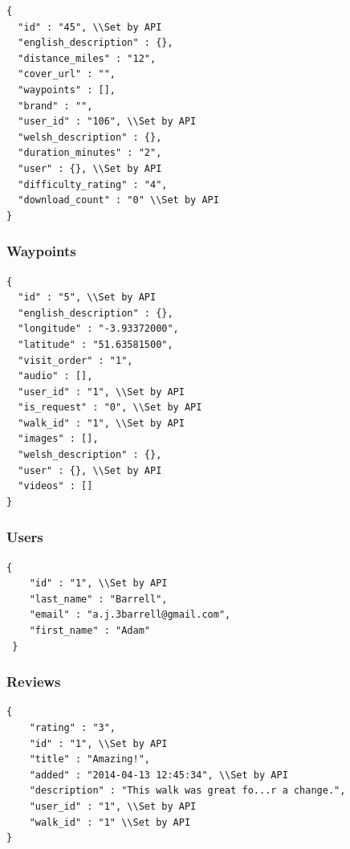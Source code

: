 \documentclass[11pt,a4paper]{report}
\begin{document}
\begin{lstlisting}[captionpos=b, caption=An example JSON Walk Object., label=lst:walk]
{
  "id" : "45", \\Set by API
  "english_description" : {},
  "distance_miles" : "12",
  "cover_url" : "",
  "waypoints" : [],
  "brand" : "",
  "user_id" : "106", \\Set by API
  "welsh_description" : {},
  "duration_minutes" : "2",
  "user" : {}, \\Set by API
  "difficulty_rating" : "4",
  "download_count" : "0" \\Set by API
}
\end{lstlisting}


\subsubsection{Waypoints}

\begin{lstlisting}[captionpos=b, caption=An example JSON Waypoint Object., label=lst:walk]
{
  "id" : "5", \\Set by API
  "english_description" : {},
  "longitude" : "-3.93372000",
  "latitude" : "51.63581500",
  "visit_order" : "1",
  "audio" : [],
  "user_id" : "1", \\Set by API
  "is_request" : "0", \\Set by API
  "walk_id" : "1", \\Set by API
  "images" : [],
  "welsh_description" : {},
  "user" : {}, \\Set by API
  "videos" : []
}
\end{lstlisting}

\subsubsection{Users}

\begin{lstlisting}[captionpos=b, caption=An example JSON Waypoint Object., label=lst:walk]
{
    "id" : "1", \\Set by API
    "last_name" : "Barrell",
    "email" : "a.j.3barrell@gmail.com",
    "first_name" : "Adam"
 }
\end{lstlisting}

\subsubsection{Reviews}

\begin{lstlisting}[captionpos=b, caption=An example JSON Waypoint Object., label=lst:walk]
{
    "rating" : "3",
    "id" : "1", \\Set by API
    "title" : "Amazing!",
    "added" : "2014-04-13 12:45:34", \\Set by API
    "description" : "This walk was great fo...r a change.",
    "user_id" : "1", \\Set by API
    "walk_id" : "1" \\Set by API
}
\end{lstlisting}
\end{document}
